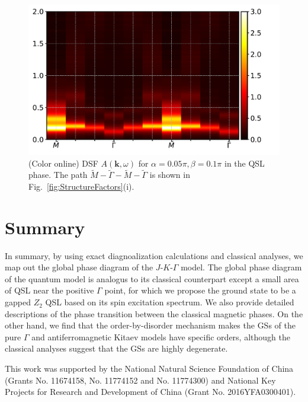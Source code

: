 \documentclass[aps,prb,reprint,amsfonts,amsmath,amssymb,showpacs,groupedaddress,superscriptaddress]{revtex4-1}
\begin{document}
\begin{figure}
    \centering
    \includegraphics[width=\columnwidth]{fig/Spectrum.pdf}
    \caption{\label{fig:Spectrum}(Color online) DSF $A(\bm{k}, \omega)$ for $\alpha=0.05\pi,\beta=0.1\pi$ in the QSL phase. The path $\tilde{M}-\tilde{\Gamma}-\tilde{M}-\tilde{\Gamma}$ is shown in Fig.~\ref{fig:StructureFactors}(i).}
\end{figure}


\section{\label{sec:Summary}Summary}

In summary, by using exact diagnoalization calculations and classical analyses, we map out the global phase diagram of the $J$-$K$-$\Gamma$ model. The global phase diagram of the quantum model is analogus to its classical counterpart except a small area of QSL near the positive $\Gamma$ point, for which we propose the ground state to be a gapped $Z_{2}$ QSL based on its spin excitation spectrum. We also provide detailed descriptions of the phase transition between the classical magnetic phases. On the other hand, we find that the order-by-disorder mechanism makes the GSs of the pure $\Gamma$ and antiferromagnetic Kitaev models have specific orders, although the classical analyses suggest that the GSs are highly degenerate.

\begin{acknowledgments}
This work was supported by the National Natural Science Foundation of China (Grants No. 11674158, No. 11774152 and No. 11774300) and National Key Projects for Research and Development of China (Grant No. 2016YFA0300401).
\end{acknowledgments}
\end{document}
